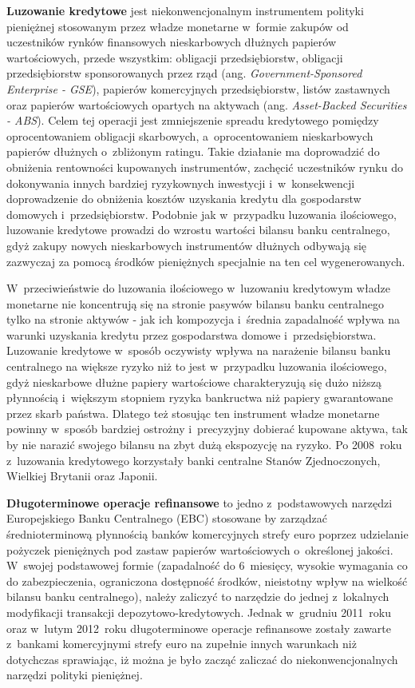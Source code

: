 \textbf{Luzowanie kredytowe} jest niekonwencjonalnym instrumentem polityki pieniężnej stosowanym przez władze monetarne w~formie zakupów od uczestników rynków finansowych nieskarbowych dłużnych papierów wartościowych, przede wszystkim: obligacji przedsiębiorstw, obligacji przedsiębiorstw sponsorowanych przez rząd (ang. \textit{Government-Sponsored Enterprise - GSE}), papierów komercyjnych przedsiębiorstw, listów zastawnych oraz papierów wartościowych opartych na aktywach (ang. \textit{Asset-Backed Securities - ABS}). Celem tej operacji jest zmniejszenie spreadu kredytowego pomiędzy oprocentowaniem obligacji skarbowych, a~oprocentowaniem nieskarbowych papierów dłużnych o~zbliżonym ratingu. Takie działanie ma doprowadzić do obniżenia rentowności kupowanych instrumentów, zachęcić uczestników rynku do dokonywania innych bardziej ryzykownych inwestycji i~w~konsekwencji doprowadzenie do obniżenia kosztów uzyskania kredytu dla gospodarstw domowych i~przedsiębiorstw. Podobnie jak w~przypadku luzowania ilościowego, luzowanie kredytowe prowadzi do wzrostu wartości bilansu banku centralnego, gdyż zakupy nowych nieskarbowych instrumentów dłużnych odbywają się zazwyczaj za pomocą środków pieniężnych specjalnie na ten cel wygenerowanych. 

W~przeciwieństwie do luzowania ilościowego w~luzowaniu kredytowym władze monetarne nie koncentrują się na stronie pasywów bilansu banku centralnego tylko na stronie aktywów - jak ich kompozycja i~średnia zapadalność wpływa na warunki uzyskania kredytu przez gospodarstwa domowe i~przedsiębiorstwa. Luzowanie kredytowe w~sposób oczywisty wpływa na narażenie bilansu banku centralnego na większe ryzyko niż to jest w~przypadku luzowania ilościowego, gdyż nieskarbowe dłużne papiery wartościowe charakteryzują się dużo niższą płynnością i~większym stopniem ryzyka bankructwa niż papiery gwarantowane przez skarb państwa. Dlatego też stosując ten instrument władze monetarne powinny w~sposób bardziej ostrożny i~precyzyjny dobierać kupowane aktywa, tak by nie narazić swojego bilansu na zbyt dużą ekspozycję na ryzyko. Po 2008~roku z~luzowania kredytowego korzystały banki centralne Stanów Zjednoczonych, Wielkiej Brytanii oraz Japonii.

\textbf{Długoterminowe operacje refinansowe} to jedno z~podstawowych narzędzi Europejskiego Banku Centralnego (EBC) stosowane by zarządzać średnioterminową płynnością banków komercyjnych strefy euro poprzez udzielanie pożyczek pieniężnych pod zastaw papierów wartościowych o~określonej jakości. W~swojej podstawowej formie (zapadalność do 6~miesięcy, wysokie wymagania co do zabezpieczenia, ograniczona dostępność środków, nieistotny wpływ na wielkość bilansu banku centralnego), należy zaliczyć to narzędzie do jednej z~lokalnych modyfikacji transakcji depozytowo-kredytowych. Jednak w~grudniu 2011~roku oraz w~lutym 2012~roku długoterminowe operacje refinansowe zostały zawarte z~bankami komercyjnymi strefy euro na zupełnie innych warunkach niż dotychczas sprawiając, iż można je było zacząć zaliczać do niekonwencjonalnych narzędzi polityki pieniężnej. 

